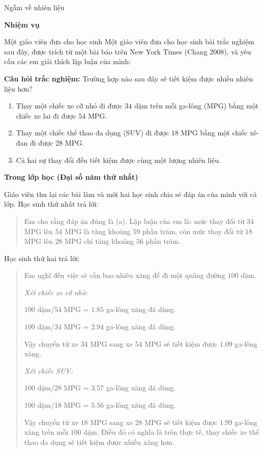 \documentclass[
  10pt,
  a4paper,
  landscape,
  twoside,
  openany
]{scrbook}
\begin{document}
{Ngẫm về nhiên liệu}
{
\noindent
\textbf{Nhiệm vụ}

Một giáo viên đưa cho học sinh Một giáo viên đưa cho học sinh bài trắc nghiệm sau đây, được trích từ một bài báo trên New York Times (Chang 2008), và yêu cầu các em giải thích lập luận của mình:

\textbf{Câu hỏi trắc nghiệm:} Trường hợp nào sau đây sẽ tiết kiệm được nhiều nhiên liệu hơn?

\begin{enumerate}
  \item [(a)] Thay một chiếc xe cỡ nhỏ đi được $34$ dặm trên mỗi ga-lông (MPG) bằng một chiếc xe lai đi được $54$ MPG.
  \item [(b)] Thay một chiếc thể thao đa dụng (SUV) đi được $18$ MPG bằng một chiếc xê-đan đi được $28$ MPG.
  \item [(c)] Cả hai sự thay đổi đều tiết kiệm được cùng một lượng nhiên liệu.
\end{enumerate}

\noindent
\textbf{Trong lớp học (Đại số năm thứ nhất)}

Giáo viên thu lại các bài làm và mời hai học sinh chia sẻ đáp án của mình với cả lớp. Học sinh thứ nhất trả lời:

\begin{quote}
  Em cho rằng đáp án đúng là (a). Lập luận của em là: mức thay đổi từ $34$ MPG lên $54$ MPG là tăng khoảng $59$ phần trăm, còn mức thay đổi từ $18$ MPG lên $28$ MPG chỉ tăng khoảng $56$ phần trăm.
\end{quote}

Học sinh thứ hai trả lời:

\begin{quote}
  Em nghĩ đến việc sẽ cần bao nhiêu xăng để đi một quãng đường $100$ dặm.

  \emph{Xét chiếc xe cỡ nhỏ:}

  $100$ dặm/$54$ MPG = $1.85$ ga-lông xăng đã dùng.

  $100$ dặm/$34$ MPG = $2.94$ ga-lông xăng đã dùng. 

  Vậy chuyển từ xe $34$ MPG sang xe $54$ MPG sẽ tiết kiệm được $1.09$ ga-lông xăng.

  \emph{Xét chiếc SUV:}

  $100$ dặm/$28$ MPG = $3.57$ ga-lông xăng đã dùng.

  $100$ dặm/$18$ MPG = $5.56$ ga-lông xăng đã dùng.

  Vậy chuyển từ xe $18$ MPG sang xe $28$ MPG sẽ tiết kiệm được $1.99$ ga-lông xăng trên mỗi $100$ dặm. Điều đó có nghĩa là trên thực tế, thay chiếc xe thể thao đa dụng sẽ tiết kiệm được nhiều xăng hơn.
\end{quote}

}
\end{document}
